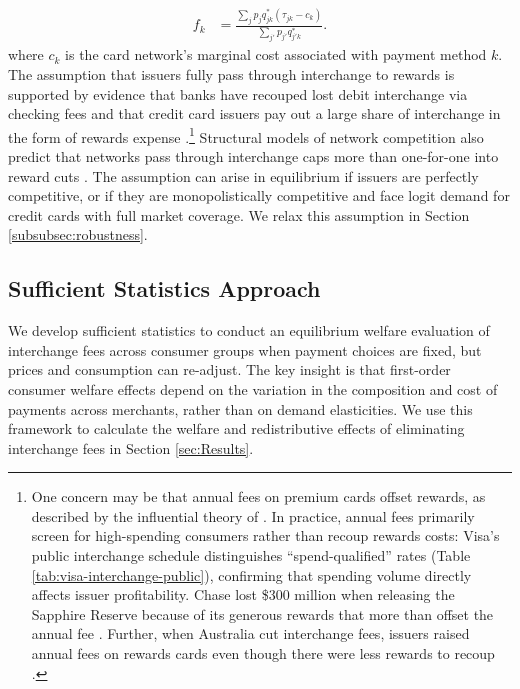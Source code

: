 \documentclass[11pt,english]{article}
\theoremstyle{remark}
\begin{document}
\begin{align*}
f_{k} & =\frac{\sum_{j}p_{j}q_{jk}^{*}\left(\tau_{jk}-c_{k}\right)}{\sum_{j'}p_{j'}q_{j'k}^{*}}.
\end{align*}
where $c_k$ is the card network's marginal cost associated with payment method $k$. The assumption that issuers fully pass through interchange to rewards is supported by evidence that banks have recouped lost debit interchange via checking fees \citep{Kay.etal2018,Mukharlyamov.Sarin2025} and that credit card issuers pay out a large share of interchange in the form of rewards expense \citep{Drechsler.etal2025,Adams.Bord2020}.\footnote{One concern may be that annual fees on premium cards offset rewards, as described by the influential theory of \citet{Bedre-Defolie.Calvano2013}.
In practice, annual fees primarily screen for high-spending consumers rather than recoup rewards costs: Visa's public interchange schedule distinguishes ``spend-qualified'' rates (Table \ref{tab:visa-interchange-public}), confirming that spending volume directly affects issuer profitability.
Chase lost \$300 million when releasing the Sapphire Reserve because of its generous rewards that more than offset the annual fee \citep{Son2018}.
Further, when Australia cut interchange fees, issuers raised annual fees on rewards cards even though there were less rewards to recoup \citep{RBA2006}.}
Structural models of network competition also predict that networks pass through interchange caps more than one-for-one into reward cuts \citep{Wang2025}.
The assumption can arise in equilibrium if issuers are perfectly competitive, or if they are monopolistically competitive and face logit demand for credit cards with full market coverage.
We relax this assumption in Section \ref{subsubsec:robustness}.

\subsection{Sufficient Statistics Approach}

We develop sufficient statistics to conduct an equilibrium welfare evaluation of interchange fees across consumer groups when payment choices are fixed, but prices and consumption can re-adjust.
The key insight is that first-order consumer welfare effects depend on the variation in the composition and cost of payments across merchants, rather than on demand elasticities. We use this framework to calculate the welfare and redistributive effects of eliminating interchange fees in Section \ref{sec:Results}.
\end{document}
